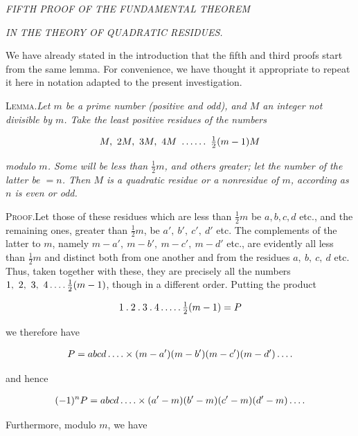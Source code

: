 \begin{center}
\textit{FIFTH PROOF OF THE FUNDAMENTAL THEOREM}\par
\textit{IN THE THEORY OF QUADRATIC RESIDUES.}
\end{center}


We have already stated in the introduction that the fifth and third proofs start from the same lemma. For convenience, we have thought it appropriate to repeat it here in notation adapted to the present investigation.

\textsc{Lemma.}\quad \textit{Let $m$ be a prime number (positive and odd), and $M$ an integer not divisible by $m$. Take the least positive residues of the numbers}

\[
\begin{aligned}
M,\ 2M,\ 3M,\ 4M\ \mathinner{.\,.\,.\,.\,.\,.}\ \tfrac12(m-1)M
\end{aligned}
\]

\textit{modulo $m$. Some will be less than $\tfrac12m$, and others greater; let the number of the latter be $=n$. Then $M$ is a quadratic residue or a nonresidue of $m$, according as $n$ is even or odd.}

\textsc{Proof.}\quad Let those of these residues which are less than $\tfrac12m$ be $a,b,c,d$ etc., and the remaining ones, greater than $\tfrac12m$, be $a',\ b',\ c',\ d'$ etc. The complements of the latter to $m$, namely $m-a',\ m-b',\ m-c',\ m-d'$ etc., are evidently all less than $\tfrac12m$ and distinct both from one another and from the residues $a,\ b,\ c,\ d$ etc. Thus, taken together with these, they are precisely all the numbers $1,\ 2,\ 3,\ 4\mathinner{.\,.\,.\,.}\tfrac12(m-1)$, though in a different order. Putting the product

\[
\begin{aligned}
1\mathbin{.}2\mathbin{.}3\mathbin{.}4\mathinner{.\,.\,.\,.\,.}\tfrac12(m-1)=P
\end{aligned}
\]

we therefore have

\[
\begin{aligned}
P=abcd\mathinner{.\,.\,.\,.}\times(m-a')(m-b')(m-c')(m-d')\mathinner{.\,.\,.\,.}
\end{aligned}
\]

and hence

\[
\begin{aligned}
(-1)^nP=abcd\mathinner{.\,.\,.\,.}\times(a'-m)(b'-m)(c'-m)(d'-m)\mathinner{.\,.\,.\,.}
\end{aligned}
\]

Furthermore, modulo $m$, we have

